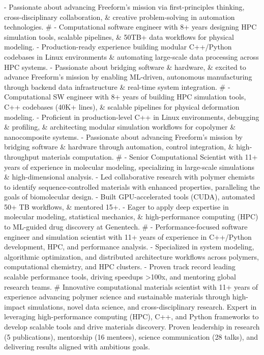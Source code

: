 - Passionate about advancing Freeform's mission via first-principles thinking, cross-disciplinary collaboration, \& creative problem-solving in automation technologies.
#
- Computational software engineer with 8+ years designing HPC simulation tools, scalable pipelines, \& 50TB+ data workflows for physical modeling.
- Production-ready experience building modular C++/Python codebases in Linux environments \& automating large-scale data processing across HPC systems.
- Passionate about bridging software \& hardware, \& excited to advance Freeform's mission by enabling ML-driven, autonomous manufacturing through backend data infrastructure \& real-time system integration.
#
- Computational SW engineer with 8+ years of building HPC simulation tools, C++ codebases (40K+ lines), \& scalable pipelines for physical deformation modeling.
- Proficient in production-level C++ in Linux environments, debugging \& profiling, \& architecting modular simulation workflows for copolymer \& nanocomposite systems.
- Passionate about advancing Freeform's mission by bridging software \& hardware through automation, control integration, \& high-throughput materials computation.
#
- Senior Computational Scientist with 11+ years of experience in molecular modeling, specializing in large-scale simulations \& high-dimensional analysis.
- Led collaborative research with polymer chemists to identify sequence-controlled materials with enhanced properties, paralleling the goals of biomolecular design.
- Built GPU-accelerated tools (CUDA), automated 50+ TB workflows, \& mentored 15+.
- Eager to apply deep expertise in molecular modeling, statistical mechanics, \& high-performance computing (HPC) to ML-guided drug discovery at Genentech.
#
- Performance-focused software engineer and simulation scientist with 11+ years of experience in C++/Python development, HPC, and performance analysis.
- Specialized in system modeling, algorithmic optimization, and distributed architecture workflows across polymers, computational chemistry, and HPC clusters.
- Proven track record leading scalable performance tools, driving speedups >100x, and mentoring global research teams.
#
Innovative computational materials scientist with 11+ years of experience advancing polymer science and sustainable materials through high-impact simulations, novel data science, and cross-disciplinary research. Expert in leveraging high-performance computing (HPC), C++, and Python frameworks to develop scalable tools and drive materials discovery. Proven leadership in research (5 publications), mentorship (16 mentees), science communication (28 talks), and delivering results aligned with ambitious goals.
